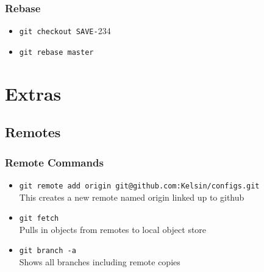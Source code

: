 \begin{frame}
  \frametitle{Rebase}
  \begin{itemize}
    \item \texttt{git checkout SAVE-}234
    \item \texttt{git rebase master}
  \end{itemize}
   { }
   { }
\end{frame}

\section{Extras}

\subsection{Remotes}

\begin{frame}
  \frametitle{Remote Commands}
  \begin{itemize}
  \item \texttt{git remote add origin git@github.com:Kelsin/configs.git}
    \\ This creates a new remote named origin linked up to github
    \pause
  \item \texttt{git fetch}
    \\ Pulls in objects from remotes to local object store
    \pause
  \item \texttt{git branch -a}
    \\ Shows all branches including remote copies
  \end{itemize}
\end{frame}


